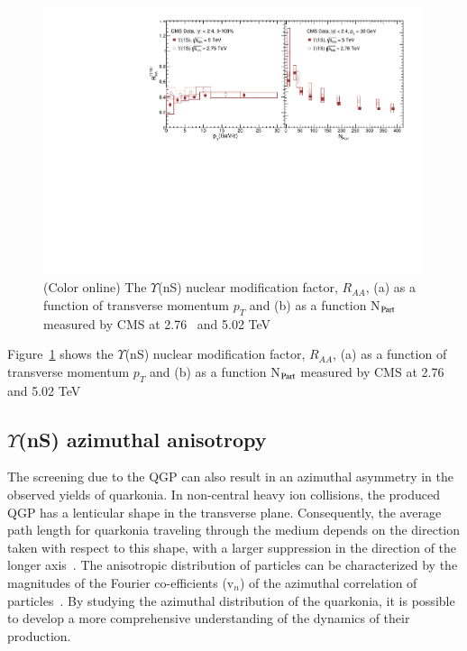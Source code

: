 \begin{figure}
  \includegraphics[width=0.99\textwidth]{Figures/ExpOverview/Fig_CMS_Y1SRAAPtNPart_En.pdf}
  \caption{(Color online) The $\Upsilon$(nS) nuclear modification factor, $R_{AA}$, (a) as a function of transverse momentum $p_{T}$
    and (b) as a function N$_{\rm Part}$ measured by CMS
    at 2.76~\cite{Khachatryan:2016xxp} and 5.02 TeV~\cite{CMS:2018zza}
  }
  \label{fig:LHCYnSRAAenergy}
\end{figure}




Figure~\ref{fig:LHCYnSRAAenergy} shows 
  the $\Upsilon$(nS) nuclear modification factor, $R_{AA}$, (a) as a function of transverse momentum $p_{T}$
  and (b) as a function N$_{\rm Part}$ measured by CMS
    at 2.76~\cite{Khachatryan:2016xxp} and 5.02 TeV~\cite{CMS:2018zza}
  

  
    
\subsection{$\Upsilon$(nS) azimuthal anisotropy}

The screening due to the QGP can also result in an azimuthal asymmetry in the observed yields of quarkonia. In non-central
heavy ion collisions, the produced QGP has a lenticular shape in the transverse plane. Consequently, the average path length
for quarkonia traveling through the medium depends on the direction taken with respect to this shape, with a larger suppression
in the direction of the longer axis~\cite{He:2015hfa}. The anisotropic distribution of particles can be characterized by the magnitudes
of the Fourier co-efficients (v$_{n}$) of the azimuthal correlation of particles~\cite{Voloshin:1994mz}. By studying the
azimuthal distribution of the quarkonia, it is possible to develop a more comprehensive understanding of the dynamics of their
production.

